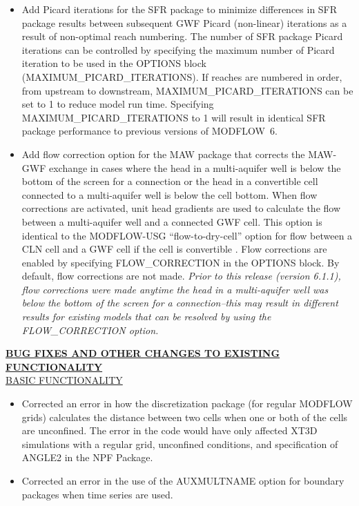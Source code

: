 \documentclass[11pt,twoside,twocolumn]{usgsreport}
\begin{document}
\begin{itemize}
\begin{itemize}
		\item Add Picard iterations for the SFR package to minimize differences in SFR package results between subsequent GWF Picard (non-linear) iterations as a result of non-optimal reach numbering. The number of SFR package Picard iterations can be controlled by specifying the maximum number of Picard  iteration to be used in the OPTIONS block (MAXIMUM\_PICARD\_ITERATIONS). If reaches are numbered in order, from upstream to downstream, MAXIMUM\_PICARD\_ITERATIONS can be set to 1 to reduce model run time. Specifying  MAXIMUM\_PICARD\_ITERATIONS to 1 will result in identical SFR package performance to previous versions of MODFLOW~6.
		\item Add flow correction option for the MAW package that corrects the MAW-GWF exchange in cases where the head in a multi-aquifer well is below the bottom of the screen for a connection or the head in a convertible cell connected to a multi-aquifer well is below the cell bottom.  When flow corrections are activated, unit head gradients are used to calculate the flow between a multi-aquifer well and a connected GWF cell. This option is identical to the MODFLOW-USG ``flow-to-dry-cell'' option for flow between a CLN cell and a GWF cell if the cell is convertible \citep{modflowusg}. Flow corrections are enabled by specifying FLOW\_CORRECTION in the OPTIONS block. By default, flow corrections are not made. \emph{Prior to this release (version 6.1.1), flow corrections were made anytime the head in a multi-aquifer well was below the bottom of the screen for a connection--this may result in different results for existing models that can be resolved by using the FLOW\_CORRECTION option.}
	\end{itemize}

	\textbf{\underline{BUG FIXES AND OTHER CHANGES TO EXISTING FUNCTIONALITY}} \\
	\underline{BASIC FUNCTIONALITY}
	\begin{itemize}
		\item Corrected an error in how the discretization package (for regular MODFLOW grids) calculates the distance between two cells when one or both of the cells are unconfined.  The error in the code would have only affected XT3D simulations with a regular grid, unconfined conditions, and specification of ANGLE2 in the NPF Package.  
		\item Corrected an error in the use of the AUXMULTNAME option for boundary packages when time series are used.
	\end{itemize}


\end{itemize}
\end{document}
